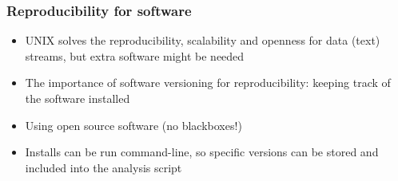 \documentclass{beamer}
\begin{document}







\begin{frame}
\frametitle{Reproducibility for software}
\begin{itemize}
\item UNIX solves the reproducibility, scalability and openness for data (text) streams, but extra software might be needed
\item The importance of software versioning for reproducibility: keeping track of the software installed
\item Using open source software (no blackboxes!)
\item Installs can be run command-line, so specific versions can be stored and included into the analysis script
\end{itemize}
  
\end{frame}



\end{document}
